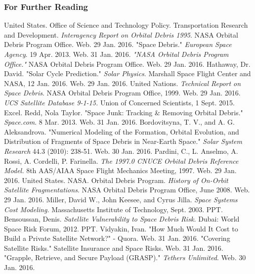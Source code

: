 \documentclass{beamer}
\begin{document}
\begin{frame}[allowframebreaks]
  \frametitle<presentation>{For Further Reading}
    
  \begin{thebibliography}{10}
    
  \beamertemplatebookbibitems

\tiny{
United States. Office of Science and Technology Policy. Transportation Research and Development. \textit{Interagency Report on Orbital Debris 1995}. NASA Orbital Debris Program Office. Web. 29 Jan. 2016.
"Space Debris." \textit{European Space Agency}. 19 Apr. 2013. Web. 31 Jan. 2016.
\textit{"NASA Orbital Debris Program Office."} NASA Orbital Debris Program Office. Web. 29 Jan. 2016.
Hathaway, Dr. David. "Solar Cycle Prediction." \textit{Solar Physics}. Marshall Space Flight Center and NASA, 12 Jan. 2016. Web. 29 Jan. 2016.
United Nations. \textit{Technical Report on Space Debris}. NASA Orbital Debris Program Office, 1999. Web. 29 Jan. 2016.
\textit{UCS Satellite Database 9-1-15.} Union of Concerned Scientists, 1 Sept. 2015. Excel.
Redd, Nola Taylor. "Space Junk: Tracking \& Removing Orbital Debris." \textit{Space.com}. 8 Mar. 2013. Web. 31 Jan. 2016.
Bordovitsyna, T. V., and A. G. Aleksandrova. "Numerical Modeling of the Formation, Orbital Evolution, and Distribution of Fragments of Space Debris in Near-Earth Space." \textit{Solar System Research} 44.3 (2010): 238-51. Web. 30 Jan. 2016.
Pardini, C., L. Anselmo, A. Rossi, A. Cordelli, P. Farinella. \textit{The 1997.0 CNUCE Orbital Debris Reference Model.} 8th AAS/AIAA Space Flight Mechanics Meeting, 1997. Web. 29 Jan. 2016. 
United States. NASA. Orbital Debris Program. \textit{History of On-Orbit Satellite Fragmentations}. NASA Orbital Debris Program Office, June 2008. Web. 29 Jan. 2016.
Miller, David W., John Keesee, and Cyrus Jilla. \textit{Space Systems Cost Modeling.} Massachusetts Institute of Technology, Sept. 2003. PPT.
Bensoussan, Denis. \textit{Satellite Vulnerability to Space Debris Risk.} Dubai: World Space Risk Forum, 2012. PPT.
Vidyakin, Ivan. "How Much Would It Cost to Build a Private Satellite Network?" - Quora. Web. 31 Jan. 2016.
"Covering Satellite Risks." Satellite Insurance and Space Risks. Web. 31 Jan. 2016.
"Grapple, Retrieve, and Secure Payload (GRASP)." \textit{Tethers Unlimited}. Web. 30 Jan. 2016.
}
\end{thebibliography}
\end{frame}
\end{document}
